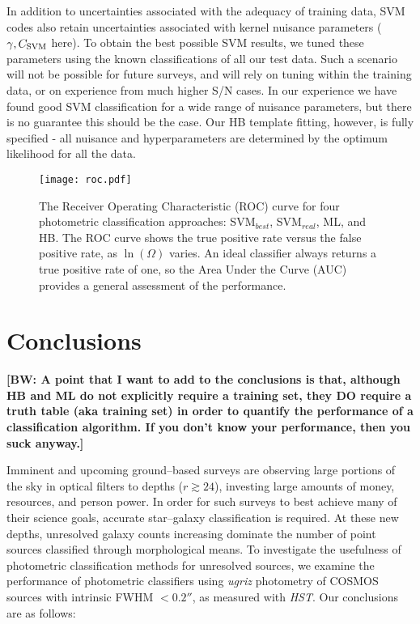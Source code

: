 \documentclass[12pt,preprint]{aastex}
\newcommand\bw[1]{{\bf [BW: #1]}}
\begin{document}
In addition to uncertainties associated with the adequacy of training
data, SVM codes also retain uncertainties associated with kernel
nuisance parameters ($\gamma,C_{\rm SVM}$ here).  To obtain the best
possible SVM results, we tuned these parameters using the known
classifications of all our test data.  Such a scenario will not be
possible for future surveys, and will rely on tuning within the
training data, or on experience from much higher S/N cases.  In our
experience we have found good SVM classification for a wide range of
nuisance parameters, but there is no guarantee this should be the
case.  Our HB template fitting, however, is fully specified - all
nuisance and hyperparameters are determined by the optimum likelihood
for all the data.


\begin{figure}
\centering
\texttt{[image: roc.pdf]}
\caption{The Receiver Operating Characteristic (ROC) curve for four photometric 
classification approaches: SVM$_{best}$, SVM$_{real}$, ML, and HB.  The ROC curve 
shows the true positive rate versus the false positive rate, as $\ln(\Omega)$ varies.  An ideal classifier 
always returns a true positive rate of one, so the Area Under the Curve (AUC) provides a 
general assessment of the performance.}
\label{fig:roc}
\end{figure}



\section{Conclusions}

\bw{A point that I want to add to the conclusions is that, although HB and ML do not explicitly require a training set, they DO require a truth table (aka training set) in order to quantify the performance of a classification algorithm.  If you don't know your performance, then you suck anyway.}

Imminent and upcoming ground--based surveys are observing large
portions of the sky in optical filters to depths ($r\gtrsim24$),
investing large amounts of money, resources, and person power.  In
order for such surveys to best achieve many of their science goals,
accurate star--galaxy classification is required.  At these new
depths, unresolved galaxy counts increasing dominate the number of
point sources classified through morphological means.  To investigate
the usefulness of photometric classification methods for unresolved
sources, we examine the performance of photometric classifiers using
{\it ugriz} photometry of COSMOS sources with intrinsic FWHM $<0.2''$,
as measured with {\it HST}.  Our conclusions are as follows:
\end{document}
